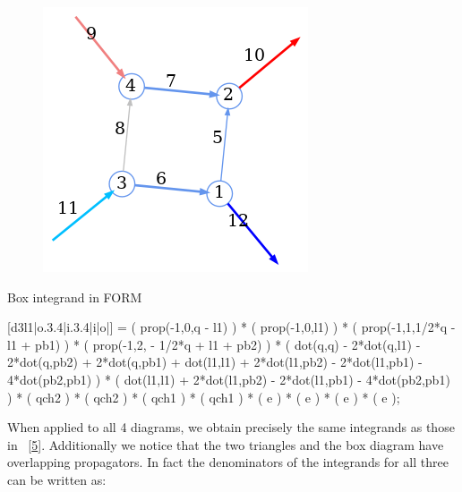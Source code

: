\documentclass[
  11pt,
  a4paper,
  DIV=11,
  numbers=noendperiod,
  twoside]{scrreprt}
\newenvironment{Shaded}{\begin{snugshade}}{\end{snugshade}}
\newcommand{\NormalTok}[1]{\textcolor[rgb]{0.00,0.23,0.31}{#1}}
\DeclareRobustCommand{\[}{\begin{equation}}
\DeclareRobustCommand{\]}{\end{equation}}
\begin{document}
\begin{figure}


{\centering \includegraphics{./kruskalbox.png}

}

\end{figure}

\begin{codelisting}

\caption{Box integrand in FORM}

\hypertarget{lst-formBox}{%
\label{lst-formBox}}%
\begin{Shaded}
\begin{Highlighting}[]

\NormalTok{   [d3l1|o.3.4|i.3.4|i|o|] =}
\NormalTok{         ( prop({-}1,0,q {-} l1) )}
\NormalTok{       * ( prop({-}1,0,l1) )}
\NormalTok{       * ( prop({-}1,1,1/2*q {-} l1 + pb1) )}
\NormalTok{       * ( prop({-}1,2, {-} 1/2*q + l1 + pb2) )}
\NormalTok{       * ( dot(q,q) {-} 2*dot(q,l1) {-} 2*dot(q,pb2) + 2*dot(q,pb1) + dot(l1,l1)}
\NormalTok{          + 2*dot(l1,pb2) {-} 2*dot(l1,pb1) {-} 4*dot(pb2,pb1) )}
\NormalTok{       * ( dot(l1,l1) + 2*dot(l1,pb2) {-} 2*dot(l1,pb1) {-} 4*dot(pb2,pb1) )}
\NormalTok{       * ( qch2 ) * ( qch2 ) * ( qch1 ) * ( qch1 )}
\NormalTok{       * ( e ) * ( e ) * ( e ) * ( e );}
\end{Highlighting}
\end{Shaded}

\end{codelisting}

When applied to all 4 diagrams, we obtain precisely the same integrands
as those in ~{[}\protect\hyperlink{ref-Kosower:2018adc}{5}{]}.
Additionally we notice that the two triangles and the box diagram have
overlapping propagators. In fact the denominators of the integrands for
all three can be written as:
\end{document}
